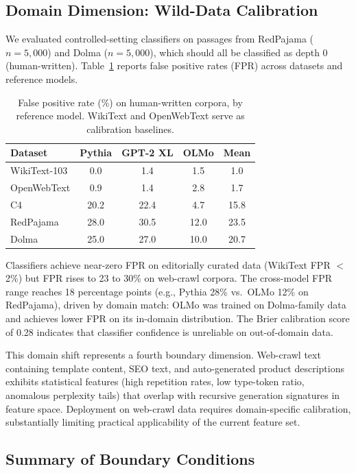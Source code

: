 \documentclass[11pt,a4paper]{article}
\begin{document}
\subsection{Domain Dimension: Wild-Data Calibration}
\label{sec:wild}

We evaluated controlled-setting classifiers on passages from RedPajama ($n{=}5{,}000$) and Dolma ($n{=}5{,}000$), which should all be classified as depth 0 (human-written).
Table~\ref{tab:wild_fpr} reports false positive rates (FPR) across datasets and reference models.

\begin{table}[t]
\centering
\caption{False positive rate (\%) on human-written corpora, by reference model. WikiText and OpenWebText serve as calibration baselines.}
\label{tab:wild_fpr}
\small
\begin{tabular}{lcccc}
\toprule
Dataset & Pythia & GPT-2 XL & OLMo & Mean \\
\midrule
WikiText-103   & 0.0  & 1.4  & 1.5  & 1.0 \\
OpenWebText    & 0.9  & 1.4  & 2.8  & 1.7 \\
C4             & 20.2 & 22.4 & 4.7  & 15.8 \\
RedPajama      & 28.0 & 30.5 & 12.0 & 23.5 \\
Dolma          & 25.0 & 27.0 & 10.0 & 20.7 \\
\bottomrule
\end{tabular}
\end{table}

Classifiers achieve near-zero FPR on editorially curated data (WikiText FPR $<$ 2\%) but FPR rises to 23 to 30\% on web-crawl corpora.
The cross-model FPR range reaches 18 percentage points (e.g., Pythia 28\% vs.\ OLMo 12\% on RedPajama), driven by domain match: OLMo was trained on Dolma-family data and achieves lower FPR on its in-domain distribution.
The Brier calibration score of 0.28 indicates that classifier confidence is unreliable on out-of-domain data.

This domain shift represents a fourth boundary dimension.
Web-crawl text containing template content, SEO text, and auto-generated product descriptions exhibits statistical features (high repetition rates, low type-token ratio, anomalous perplexity tails) that overlap with recursive generation signatures in feature space.
Deployment on web-crawl data requires domain-specific calibration, substantially limiting practical applicability of the current feature set.

\subsection{Summary of Boundary Conditions}
\end{document}
